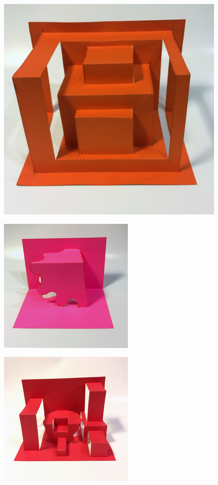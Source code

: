 \begin{figure}[htbp]
\centering
\includegraphics{figures/92_Appendix_Visual_Aids_Materials/completed_card1.png}
\caption{}
\end{figure}

\begin{figure}[htbp]
\centering
\includegraphics{figures/92_Appendix_Visual_Aids_Materials/completed_card2.png}
\caption{}
\end{figure}

\begin{figure}[htbp]
\centering
\includegraphics{figures/92_Appendix_Visual_Aids_Materials/completed_card3.png}
\caption{}
\end{figure}

